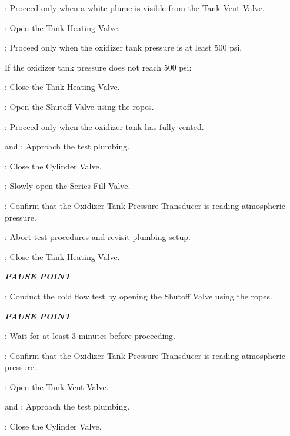 \begin{checklist}
\begin{checklist}[label=$\bullet$]
\begin{checklist}
        \end{checklist}
    \end{checklist}
    \item \secondary{}: Proceed only when a white plume is visible from the Tank Vent Valve.
    \item \heat: Open the Tank Heating Valve.
    \item \daq{}: Proceed only when the oxidizer tank pressure is at least 500 psi.
    \begin{checklist}[label=$\bullet$]
        \item If the oxidizer tank pressure does not reach 500 psi:
        \begin{checklist}
            \item \heat: Close the Tank Heating Valve.
            \item \primary{}: Open the Shutoff Valve using the ropes.
            \item \secondary: Proceed only when the oxidizer tank has fully vented.
            \item \primary{} and \secondary: Approach the test plumbing.
            \item \primary{}: Close the Cylinder Valve.
            \item \primary{}: Slowly open the Series Fill Valve.
            \item \daq{}: Confirm that the Oxidizer Tank Pressure Transducer is reading atmospheric pressure.
            \item \ops{}: Abort test procedures and revisit plumbing setup.
        \end{checklist}
    \end{checklist}
    \item \heat: Close the Tank Heating Valve.
    \item \textbf{\textit{PAUSE POINT}}
    \item \primary{}: Conduct the cold flow test by opening the Shutoff Valve using the ropes.
    \item \textbf{\textit{PAUSE POINT}}
    \item \ops{}: Wait for at least 3 minutes before proceeding.
    \item \daq{}: Confirm that the Oxidizer Tank Pressure Transducer is reading atmospheric pressure.
    \item \primary{}: Open the Tank Vent Valve.
    \item \primary{} and \secondary: Approach the test plumbing.
    \item \primary{}: Close the Cylinder Valve.

\end{checklist}

